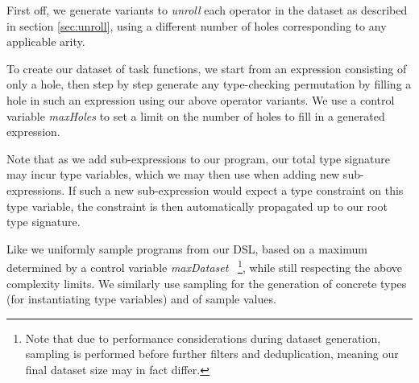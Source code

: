 \documentclass{article}
\begin{document}

First off, we generate variants to \emph{unroll} each operator in the dataset
as described in section \ref{sec:unroll},
using a different number of holes corresponding to any applicable arity.


To create our dataset of task functions,
we start from an expression consisting of only a hole,
then step by step generate any type-checking permutation
by filling a hole in such an expression using our above operator variants.
We use a control variable \emph{maxHoles} to set a limit on
the number of holes to fill in a generated expression.

Note that as we add sub-expressions to our program,
our total type signature may incur type variables,
which we may then use when adding new sub-expressions.
If such a new sub-expression would expect a type constraint on this type variable,
the constraint is then automatically propagated up to our root type signature.

Like \citet{nsps} we uniformly sample programs from our DSL,
based on a maximum determined by a control variable \emph{maxDataset}%
~\footnote{
    Note that due to performance considerations during dataset generation,
    sampling is performed before further filters and deduplication,
    meaning our final dataset size may in fact differ.
},
while still respecting the above complexity limits.
We similarly use sampling for the generation of
concrete types (for instantiating type variables) and of sample values.
\end{document}
